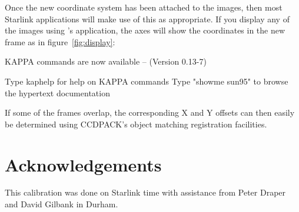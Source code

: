 \documentclass[twoside,11pt]{starlink}
\begin{document}
Once the new coordinate system has been attached to the images,
then most Starlink applications will make use of this as appropriate.
If you display any of the images using
's
application, the axes will show the coordinates in the new frame
as in figure~\ref{fig:display}:
\begin{terminalv}

   KAPPA commands are now available -- (Version 0.13-7)

   Type kaphelp for help on KAPPA commands
   Type "showme sun95" to browse the hypertext documentation

\end{terminalv}


If some of the frames overlap, the corresponding X and Y
offsets can then easily be determined
using CCDPACK's object matching registration facilities.


\section{Acknowledgements}

This calibration was done on Starlink time with assistance from
Peter Draper and David Gilbank in Durham.

\end{document}
